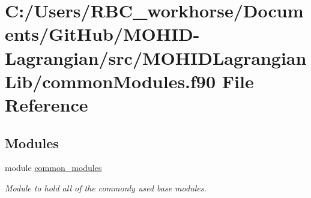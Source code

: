 \hypertarget{common_modules_8f90}{}\section{C\+:/\+Users/\+R\+B\+C\+\_\+workhorse/\+Documents/\+Git\+Hub/\+M\+O\+H\+I\+D-\/\+Lagrangian/src/\+M\+O\+H\+I\+D\+Lagrangian\+Lib/common\+Modules.f90 File Reference}
\label{common_modules_8f90}
\subsection*{Modules}
\begin{DoxyCompactItemize}
\item 
module \mbox{\hyperlink{namespacecommon__modules}{common\+\_\+modules}}
\begin{DoxyCompactList}\small\item\em Module to hold all of the commonly used base modules. \end{DoxyCompactList}\end{DoxyCompactItemize}

